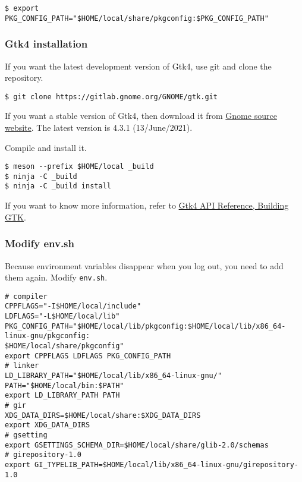 \begin{lstlisting}
$ export PKG_CONFIG_PATH="$HOME/local/share/pkgconfig:$PKG_CONFIG_PATH"
\end{lstlisting}

\hypertarget{gtk4-installation}{%
\subsubsection{Gtk4 installation}\label{gtk4-installation}}

If you want the latest development version of Gtk4, use git and clone
the repository.

\begin{lstlisting}
$ git clone https://gitlab.gnome.org/GNOME/gtk.git
\end{lstlisting}

If you want a stable version of Gtk4, then download it from
\href{https://download.gnome.org/sources/gtk/}{Gnome source website}.
The latest version is 4.3.1 (13/June/2021).

Compile and install it.

\begin{lstlisting}
$ meson --prefix $HOME/local _build
$ ninja -C _build
$ ninja -C _build install
\end{lstlisting}

If you want to know more information, refer to
\href{https://docs.gtk.org/gtk4/building.html}{Gtk4 API Reference,
Building GTK}.

\hypertarget{modify-env.sh}{%
\subsubsection{Modify env.sh}\label{modify-env.sh}}

Because environment variables disappear when you log out, you need to
add them again. Modify \passthrough{\lstinline!env.sh!}.

\begin{lstlisting}
# compiler
CPPFLAGS="-I$HOME/local/include"
LDFLAGS="-L$HOME/local/lib"
PKG_CONFIG_PATH="$HOME/local/lib/pkgconfig:$HOME/local/lib/x86_64-linux-gnu/pkgconfig:
$HOME/local/share/pkgconfig"
export CPPFLAGS LDFLAGS PKG_CONFIG_PATH
# linker
LD_LIBRARY_PATH="$HOME/local/lib/x86_64-linux-gnu/"
PATH="$HOME/local/bin:$PATH"
export LD_LIBRARY_PATH PATH
# gir
XDG_DATA_DIRS=$HOME/local/share:$XDG_DATA_DIRS
export XDG_DATA_DIRS
# gsetting
export GSETTINGS_SCHEMA_DIR=$HOME/local/share/glib-2.0/schemas
# girepository-1.0
export GI_TYPELIB_PATH=$HOME/local/lib/x86_64-linux-gnu/girepository-1.0
\end{lstlisting}

